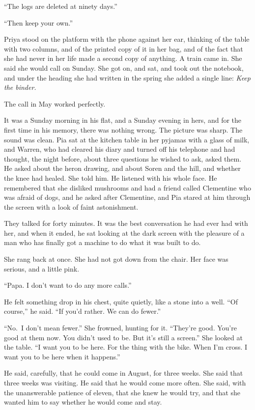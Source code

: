 ``The logs are deleted at ninety days.''

``Then keep your own.''

Priya stood on the platform with the phone against her ear, thinking of the table with two columns, and of the printed copy of it in her bag, and of the fact that she had never in her life made a second copy of anything. A train came in. She said she would call on Sunday. She got on, and sat, and took out the notebook, and under the heading she had written in the spring she added a single line: \emph{Keep the binder.}

\scenebreak
\noindent The call in May worked perfectly.

It was a Sunday morning in his flat, and a Sunday evening in hers, and for the first time in his memory, there was nothing wrong. The picture was sharp. The sound was clean. Pia sat at the kitchen table in her pyjamas with a glass of milk, and Warren, who had cleared his diary and turned off his telephone and had thought, the night before, about three questions he wished to ask, asked them. He asked about the heron drawing, and about Soren and the hill, and whether the knee had healed. She told him. He listened with his whole face. He remembered that she disliked mushrooms and had a friend called Clementine who was afraid of dogs, and he asked after Clementine, and Pia stared at him through the screen with a look of faint astonishment.

They talked for forty minutes. It was the best conversation he had ever had with her, and when it ended, he sat looking at the dark screen with the pleasure of a man who has finally got a machine to do what it was built to do.

She rang back at once. She had not got down from the chair. Her face was serious, and a little pink.

``Papa. I don't want to do any more calls.''

He felt something drop in his chest, quite quietly, like a stone into a well. ``Of course,'' he said. ``If you'd rather. We can do fewer.''

``No.~I don't mean fewer.'' She frowned, hunting for it. ``They're good. You're good at them now. You didn't used to be. But it's still a screen.'' She looked at the table. ``I want you to be here. For the thing with the bike. When I'm cross. I want you to be here when it happens.''

He said, carefully, that he could come in August, for three weeks. She said that three weeks was visiting. He said that he would come more often. She said, with the unanswerable patience of eleven, that she knew he would try, and that she wanted him to say whether he would come and stay.

